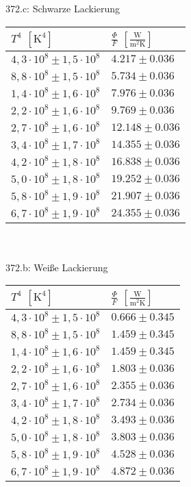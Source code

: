 \documentclass[a4paper,12pt]{article}
\begin{document}
\noindent 372.c: Schwarze Lackierung\\
\begin{tabular}{ ll }
        $T^4$ $[\text{K}^4]$ & $\tfrac{\Phi }{F}$ $[\tfrac{\text{W}}{\text{m}^2\text{K}}]$ \\
	\hline
        $4,3\cdot 10^8\pm 1,5\cdot 10^8 $& $4.217 \pm 0.036$ \\
        $8,8\cdot 10^8\pm 1,5\cdot 10^8 $& $5.734 \pm 0.036$ \\
        $1,4\cdot 10^8\pm 1,6\cdot 10^8 $& $7.976 \pm 0.036$ \\
        $2,2\cdot 10^8\pm 1,6\cdot 10^8 $& $9.769 \pm 0.036$ \\
        $2,7\cdot 10^8\pm 1,6\cdot 10^8 $& $12.148 \pm 0.036$ \\
        $3,4\cdot 10^8\pm 1,7\cdot 10^8 $& $14.355 \pm 0.036$ \\
        $4,2\cdot 10^8\pm 1,8\cdot 10^8 $& $16.838 \pm 0.036$ \\
        $5,0\cdot 10^8\pm 1,8\cdot 10^8 $& $19.252 \pm 0.036$ \\
        $5,8\cdot 10^8\pm 1,9\cdot 10^8 $& $21.907 \pm 0.036$ \\
        $6,7\cdot 10^8\pm 1,9\cdot 10^8 $& $24.355 \pm 0.036$ \\
\end{tabular}\\\\
\noindent 372.b: Weiße Lackierung\\
\begin{tabular}{ ll }
        $T^4$ $[\text{K}^4]$ & $\tfrac{\Phi }{F}$ $[\tfrac{\text{W}}{\text{m}^2\text{K}}]$ \\
        \hline
        $4,3\cdot 10^8\pm 1,5\cdot 10^8 $& $0.666 \pm 0.345$ \\
        $8,8\cdot 10^8\pm 1,5\cdot 10^8 $& $1.459 \pm 0.345$ \\
        $1,4\cdot 10^8\pm 1,6\cdot 10^8 $& $1.459 \pm 0.345$ \\
        $2,2\cdot 10^8\pm 1,6\cdot 10^8 $& $1.803 \pm 0.036$ \\
        $2,7\cdot 10^8\pm 1,6\cdot 10^8 $& $2.355 \pm 0.036$ \\
        $3,4\cdot 10^8\pm 1,7\cdot 10^8 $& $2.734 \pm 0.036$ \\
        $4,2\cdot 10^8\pm 1,8\cdot 10^8 $& $3.493 \pm 0.036$ \\
        $5,0\cdot 10^8\pm 1,8\cdot 10^8 $& $3.803 \pm 0.036$ \\
        $5,8\cdot 10^8\pm 1,9\cdot 10^8 $& $4.528 \pm 0.036$ \\
        $6,7\cdot 10^8\pm 1,9\cdot 10^8 $& $4.872 \pm 0.036$ \\
\end{tabular}\\\\
\end{document}
